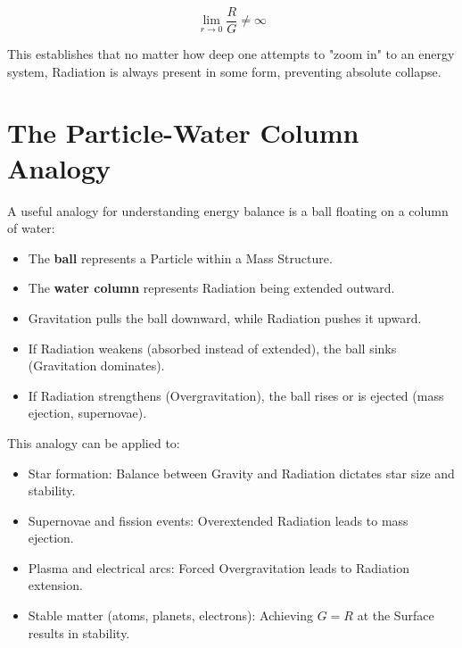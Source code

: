 \documentclass{article}
\begin{document}
\begin{equation}
    \lim_{r \to 0} \frac{R}{G} \neq \infty
\end{equation}


This establishes that no matter how deep one attempts to "zoom in" to an energy system, Radiation is always present in some form, preventing absolute collapse.

\section{The Particle-Water Column Analogy}
A useful analogy for understanding energy balance is a ball floating on a column of water:
\begin{itemize}
    \item The \textbf{ball} represents a Particle within a Mass Structure.
    \item The \textbf{water column} represents Radiation being extended outward.
    \item Gravitation pulls the ball downward, while Radiation pushes it upward.
    \item If Radiation weakens (absorbed instead of extended), the ball sinks (Gravitation dominates).
    \item If Radiation strengthens (Overgravitation), the ball rises or is ejected (mass ejection, supernovae).
\end{itemize}
This analogy can be applied to:
\begin{itemize}
    \item Star formation: Balance between Gravity and Radiation dictates star size and stability.
    \item Supernovae and fission events: Overextended Radiation leads to mass ejection.
    \item Plasma and electrical arcs: Forced Overgravitation leads to Radiation extension.
    \item Stable matter (atoms, planets, electrons): Achieving $G = R$ at the Surface results in stability.
\end{itemize}
\end{document}
